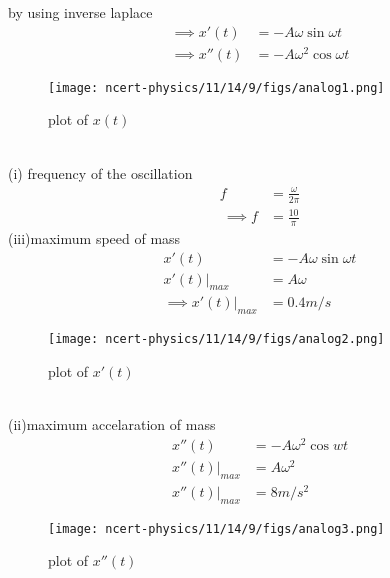 \documentclass[journal,12pt,twocolumn]{IEEEtran}
\theoremstyle{remark}
\begin{document}
by using inverse laplace
\begin{align}
\implies x'(t)&=-A\omega\sin{\omega t}\\
\implies x''(t)&=-A\omega^2 \cos{\omega t}
\end{align}
\begin{figure}[h!]
    \centering
    \texttt{[image: ncert-physics/11/14/9/figs/analog1.png]}
    \caption{plot of $x(t)$}
\end{figure}\\
(i) frequency of the oscillation
\begin{align}
    f&=\frac{\omega}{2\pi}\\\
    \implies f&=\frac{10}{\pi}
\end{align}
(iii)maximum speed of mass\\
\begin{align}
    x'(t)&=-A\omega\sin{\omega t}\\
  x'(t)\Bigr|_{max}&=A\omega\\
    \implies x'(t)\Bigr|_{max} &= 0.4 m/s
\end{align}
\begin{figure}[h!]
    \centering
    \texttt{[image: ncert-physics/11/14/9/figs/analog2.png]}
    \caption{plot of $x'(t)$}
\end{figure}\\
(ii)maximum accelaration of mass\\
\begin{align}
   x''(t)&=-A\omega^2 \cos{wt}\\
    x''(t)\Bigr|_{max}&=A\omega^2\\
    x''(t)\Bigr|_{max}&=8m/s^2
\end{align}
\begin{figure}[h!]
    \centering
    \texttt{[image: ncert-physics/11/14/9/figs/analog3.png]}
    \caption{plot of $x''(t)$}
\end{figure}
\end{document}
